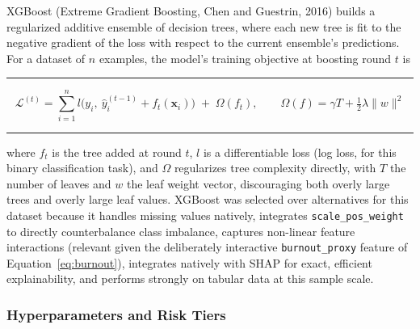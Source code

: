 \documentclass[11pt,a4paper]{article}
\newcommand{\code}[1]{\texttt{\footnotesize #1}}
\newenvironment{formulabox}
  {\begin{center}\color{TPteal}\rule{0.92\linewidth}{0.8pt}\par\vspace{5pt}\color{TPnavy}}
  {\par\vspace{3pt}\color{TPteal}\rule{0.92\linewidth}{0.8pt}\end{center}}
\begin{document}
XGBoost (Extreme Gradient Boosting, Chen and Guestrin, 2016) builds a regularized additive ensemble of decision trees, where each new tree is fit to the negative gradient of the loss with respect to the current ensemble's predictions. For a dataset of $n$ examples, the model's training objective at boosting round $t$ is

\begin{formulabox}
\begin{equation}
\label{eq:xgb-obj}
\mathcal{L}^{(t)} = \sum_{i=1}^{n} l\big(y_i,\ \hat{y}_i^{(t-1)} + f_t(\mathbf{x}_i)\big) \;+\; \Omega(f_t), \qquad \Omega(f) = \gamma T + \tfrac{1}{2}\lambda \lVert w \rVert^2
\end{equation}
\end{formulabox}

where $f_t$ is the tree added at round $t$, $l$ is a differentiable loss (log loss, for this binary classification task), and $\Omega$ regularizes tree complexity directly, with $T$ the number of leaves and $w$ the leaf weight vector, discouraging both overly large trees and overly large leaf values. XGBoost was selected over alternatives for this dataset because it handles missing values natively, integrates \code{scale\_pos\_weight} to directly counterbalance class imbalance, captures non-linear feature interactions (relevant given the deliberately interactive \code{burnout\_proxy} feature of Equation~\ref{eq:burnout}), integrates natively with SHAP for exact, efficient explainability, and performs strongly on tabular data at this sample scale.

\subsubsection{Hyperparameters and Risk Tiers}
\end{document}
